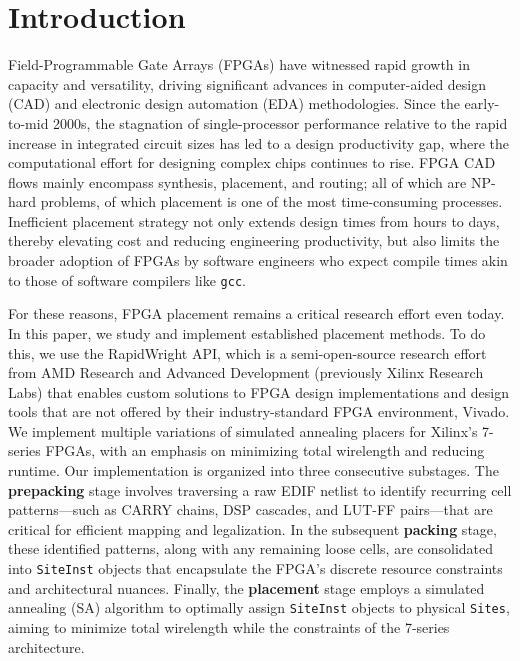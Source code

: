 \section{Introduction}

Field-Programmable Gate Arrays (FPGAs) have witnessed rapid growth in capacity and versatility, driving significant advances in computer-aided design (CAD) and electronic design automation (EDA) methodologies. 
Since the early-to-mid 2000s, the stagnation of single-processor performance relative to the rapid increase in integrated circuit sizes has led to a design productivity gap, where the computational effort for designing complex chips continues to rise. 
FPGA CAD flows mainly encompass synthesis, placement, and routing; all of which are NP-hard problems, of which placement is one of the most time-consuming processes. 
Inefficient placement strategy not only extends design times from hours to days, thereby elevating cost and reducing engineering productivity, but also limits the broader adoption of FPGAs by software engineers who expect compile times akin to those of software compilers like {\tt gcc}. 

For these reasons, FPGA placement remains a critical research effort even today. 
In this paper, we study and implement established placement methods. 
To do this, we use the RapidWright API, which is a semi-open-source research effort from AMD Research and Advanced Development (previously Xilinx Research Labs) that enables custom solutions to FPGA design implementations and design tools that are not offered by their industry-standard FPGA environment, Vivado. 
We implement multiple variations of simulated annealing placers for Xilinx's 7-series FPGAs, with an emphasis on minimizing total wirelength and reducing runtime. 
Our implementation is organized into three consecutive substages. 
The \textbf{prepacking} stage involves traversing a raw EDIF netlist to identify recurring cell patterns—such as CARRY chains, DSP cascades, and LUT-FF pairs—that are critical for efficient mapping and legalization. 
In the subsequent \textbf{packing} stage, these identified patterns, along with any remaining loose cells, are consolidated into \texttt{SiteInst} objects that encapsulate the FPGA’s discrete resource constraints and architectural nuances. 
Finally, the \textbf{placement} stage employs a simulated annealing (SA) algorithm to optimally assign \texttt{SiteInst} objects to physical \texttt{Sites}, aiming to minimize total wirelength while the constraints of the 7-series architecture. 

